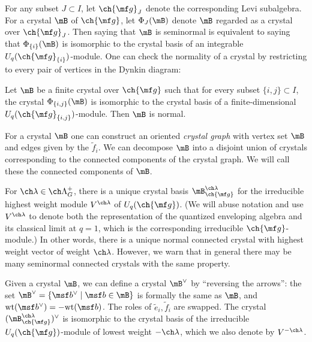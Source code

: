 For any subset $J\subset I$, let $\ch{\mf g}_J$ denote the corresponding Levi subalgebra.
For a crystal $\mB$ of $\ch{\mf g}$, let $\Phi_J(\mB)$ denote $\mB$ regarded as a crystal
over $\ch{\mf g}_J$.
Then saying that $\mB$ is seminormal is equivalent to saying that
$\Phi_{\{i\}}(\mB)$ is isomorphic to the crystal basis of an integrable
$U_q(\ch{\mf g}_{\{i\}})$-module.
One can check the normality of a crystal by restricting to every pair
of vertices in the Dynkin diagram:

\begin{prop}
\notready
\label{prop:normal2}
Let $\mB$ be a finite crystal over $\ch{\mf g}$ such that for every
subset $\{i,j\} \subset I$, the crystal $\Phi_{\{i,j\}}(\mB)$ is isomorphic to the
crystal basis of a finite-dimensional $U_q(\ch{\mf g}_{\{i,j\}})$-module.
Then $\mB$ is normal.
\end{prop}


For a crystal $\mB$ one can construct an oriented \emph{crystal graph} with vertex set $\mB$ and
edges given by the $\tilde f_i$. We can decompose $\mB$ into a disjoint union
of crystals corresponding to the connected components of the crystal graph. We will
call these the connected components of $\mB$.


For $\ch\lambda \in \ch\Lambda^+_G$, there is a unique crystal basis
$\mB^{\ch\lambda}_{\ch{\mf g}}$ for the irreducible highest weight module $V^{\ch\lambda}$
of $U_q(\ch{\mf g})$. (We will abuse notation and use $V^{\ch\lambda}$ to denote
both the representation of the quantized enveloping algebra and its classical limit at
$q=1$, which is the corresponding irreducible $\ch{\mf g}$-module.)
In other words, there is a unique normal connected crystal with highest weight vector of weight
$\ch\lambda$. However, we warn that in general there may be many seminormal connected crystals
with the same property.

Given a crystal $\mB$, we can define a crystal $\mB^\vee$ by ``reversing the arrows'':
the set $\mB^\vee = \{ \msf b^\vee \mid \msf b \in \mB\}$ is formally the same as $\mB$, and
$\mathrm{wt}(\msf b^\vee) = -\mathrm{wt}(\msf b)$. The roles of $\tilde e_i,\tilde f_i$
are swapped.
The crystal $(\mB^{\ch\lambda}_{\ch{\mf g}})^\vee$ is isomorphic to the crystal
basis of the irreducible $U_q(\ch{\mf g})$-module of lowest weight $-\ch\lambda$, which
we also denote by $V^{-\ch\lambda}$.


